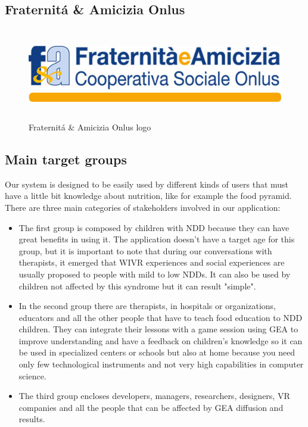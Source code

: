\subsection{Fraternit\'a \& Amicizia Onlus}
\begin{figure}[H]
\centering
\includegraphics[width=12cm, height=4cm]{immagini/logofa.jpg}
\caption{Fraternit\'a \& Amicizia Onlus logo}\label{fig:logofa}
\end{figure}
\subsection{Main target groups}
Our system is designed to be easily used by different kinds of users that must have a little bit knowledge about nutrition, like for example the food pyramid. There are three main categories of stakeholders involved in our application:
\begin{itemize}
\item The first group is composed by children with NDD because they can have great benefits in using it. The application doesn't have a target age for this group, but it is important to note that during our conversations with therapists, it emerged that WIVR experiences and social experiences are usually proposed to people with mild to low NDDs. It can also be used by children not affected by this syndrome but it can result "simple".
\item In the second group there are therapists, in hospitals or organizations, educators and all the other people that have to teach food education to NDD children. They can integrate their lessons with a game session using GEA to improve understanding and have a feedback on children's knowledge so it can be used in specialized centers or schools but also at home because you need only few technological instruments and not very high capabilities in computer science.
\item The third group encloses developers, managers, researchers, designers, VR companies and all the people that can be affected by GEA diffusion and results.
\end{itemize} 
